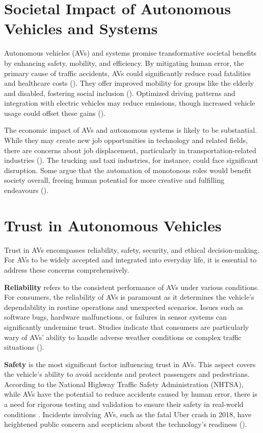 \section{Societal Impact of Autonomous Vehicles and Systems}

Autonomous vehicles (AVs) and systems promise transformative societal benefits by enhancing safety, mobility, and efficiency. By mitigating human error, the primary cause of traffic accidents, AVs could significantly reduce road fatalities and healthcare costs (\cite{Fagnant2015}). They offer improved mobility for groups like the elderly and disabled, fostering social inclusion (\cite{Harper2016}). Optimized driving patterns and integration with electric vehicles may reduce emissions, though increased vehicle usage could offset these gains (\cite{Greenblatt2015}).

The economic impact of AVs and autonomous systems is likely to be substantial. While they may create new job opportunities in technology and related fields, there are concerns about job displacement, particularly in transportation-related industries (\cite{Autor2015}). The trucking and taxi industries, for instance, could face significant disruption. Some argue that the automation of monotonous roles would benefit society overall, freeing human potential for more creative and fulfilling endeavours (\cite{Picone2025}).

\section{Trust in Autonomous Vehicles}

Trust in AVs encompasses reliability, safety, security, and ethical decision-making. For AVs to be widely accepted and integrated into everyday life, it is essential to address these concerns comprehensively.

\textbf{Reliability} refers to the consistent performance of AVs under various conditions. For consumers, the reliability of AVs is paramount as it determines the vehicle's dependability in routine operations and unexpected scenarios. Issues such as software bugs, hardware malfunctions, or failures in sensor systems can significantly undermine trust. Studies indicate that consumers are particularly wary of AVs' ability to handle adverse weather conditions or complex traffic situations (\cite{gogoll2017}).

\textbf{Safety} is the most significant factor influencing trust in AVs. This aspect covers the vehicle's ability to avoid accidents and protect passengers and pedestrians. According to the National Highway Traffic Safety Administration (NHTSA), while AVs have the potential to reduce accidents caused by human error, there is a need for rigorous testing and validation to ensure their safety in real-world conditions \cite{nhtsa2020}. Incidents involving AVs, such as the fatal Uber crash in 2018, have heightened public concern and scepticism about the technology's readiness (\cite{goodall2016}).

